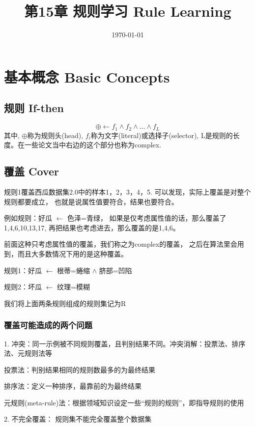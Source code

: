 \documentclass[UTF8]{article}
\title{第15章 规则学习 Rule Learning}
\author{}
\date{\today}
\begin{document}
\maketitle
\section{基本概念 Basic Concepts}
\subsection{规则 If-then}
    \begin{equation}\label{basic_form}
        \oplus \leftarrow f_1 \wedge f_2 \wedge \dots \wedge f_L
    \end{equation}
    其中, $\oplus$称为规则头(head), $f_i$称为文字(literal)或选择子(selector),
    L是规则的长度。在一些论文当中右边的这个部分也称为complex.

\subsection{覆盖 Cover}
    规则1覆盖西瓜数据集2.0中的样本1，2，3，4，5.
    可以发现，实际上覆盖是对整个规则都要成立，
    也就是说属性值要符合，结果也要符合。

    例如规则：好瓜 $\leftarrow$ 色泽=青绿，
    如果是仅考虑属性值的话，那么覆盖了1,4,6,10,13,17,
    再把结果也考虑进去，那么覆盖的是1,4,6。

    前面这种只考虑属性值的覆盖，我们称之为complex的覆盖，
    之后在算法里会用到，而且大多数情况下用的是这种覆盖。
    
    规则1：好瓜 $\leftarrow$ 根蒂=蜷缩 $\wedge$ 脐部=凹陷 \label{atomic_prop_rule}
    
    规则2：坏瓜 $\leftarrow$ 纹理=模糊

    我们将上面两条规则组成的规则集记为R

\subsubsection{覆盖可能造成的两个问题}
    1. 冲突：同一示例被不同规则覆盖，且判别结果不同。冲突消解：投票法、排序法、元规则法等  
        
    投票法：判别结果相同的规则数最多的为最终结果

    排序法：定义一种排序，最靠前的为最终结果

    元规则(meta-rule)法：根据领域知识设定一些“规则的规则”，即指导规则的使用
        
    2. 不完全覆盖： 规则集不能完全覆盖整个数据集
\end{document}

